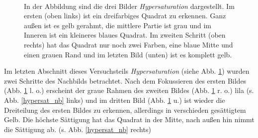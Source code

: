 \documentclass[11pt]{article}
\begin{document}
\begin{figure}[H]
\\ 
\makebox[0.25\textwidth][c]{}
\caption{In der Abbildung sind die drei Bilder \textit{Hypersaturation} dargestellt. Im ersten (oben links) ist ein dreifarbiges Quadrat zu erkennen. Ganz außen ist es gelb gerahmt, die mittlere Partie ist grau und im Inneren ist ein kleineres blaues Quadrat. Im zweiten Schritt (oben rechts) hat das Quadrat nur noch zwei Farben, eine blaue Mitte und einen grauen Rand und im letzten Bild (unten) ist es komplett gelb.}
\label{hypersat}
\end{figure}

Im letzten Abschnitt dieses Versuchsteils \textit{Hypersaturation} (siehe Abb. \ref{hypersat}) wurden zwei Schritte des Nachbilds betrachtet. Nach dem Fokussieren des ersten Bildes (Abb. \ref{hypersat} l. o.) erscheint der graue Rahmen des zweiten Bildes (Abb. \ref{hypersat} r. o.) lila (s. Abb. \ref{hypersat_nb} links) und im dritten Bild (Abb. \ref{hypersat} u.) ist wieder die Dreiteilung des ersten Bildes zu erkennen, allerdings in verschieden gesättigtem Gelb. Die höchste Sättigung hat das Quadrat in der Mitte, nach außen hin nimmt die Sättigung ab. (s. Abb. \ref{hypersat_nb} rechts)  \\
\end{document}
